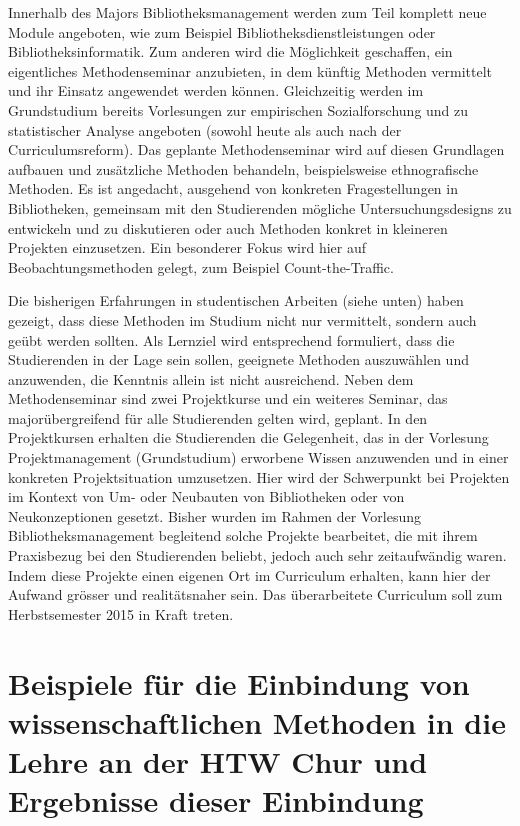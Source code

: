 \documentclass[a4paper,
fontsize=11pt,
oneside,
numbers=noperiodatend,
parskip=half-,
bibliography=totoc,
final
]{scrartcl}
\begin{document}
Innerhalb des Majors Bibliotheksmanagement werden zum Teil komplett neue
Module angeboten, wie zum Beispiel Bibliotheksdienstleistungen oder
Bibliotheksinformatik. Zum anderen wird die Möglichkeit geschaffen, ein
eigentliches Methodenseminar anzubieten, in dem künftig Methoden
vermittelt und ihr Einsatz angewendet werden können. Gleichzeitig werden
im Grundstudium bereits Vorlesungen zur empirischen Sozialforschung und
zu statistischer Analyse angeboten (sowohl heute als auch nach der
Curriculumsreform). Das geplante Methodenseminar wird auf diesen
Grundlagen aufbauen und zusätzliche Methoden behandeln, beispielsweise
ethnografische Methoden. Es ist angedacht, ausgehend von konkreten
Fragestellungen in Bibliotheken, gemeinsam mit den Studierenden mögliche
Untersuchungsdesigns zu entwickeln und zu diskutieren oder auch Methoden
konkret in kleineren Projekten einzusetzen. Ein besonderer Fokus wird
hier auf Beobachtungsmethoden gelegt, zum Beispiel Count-the-Traffic.

Die bisherigen Erfahrungen in studentischen Arbeiten (siehe unten) haben
gezeigt, dass diese Methoden im Studium nicht nur vermittelt, sondern
auch geübt werden sollten. Als Lernziel wird entsprechend formuliert,
dass die Studierenden in der Lage sein sollen, geeignete Methoden
auszuwählen und anzuwenden, die Kenntnis allein ist nicht ausreichend.
Neben dem Methodenseminar sind zwei Projektkurse und ein weiteres
Seminar, das majorübergreifend für alle Studierenden gelten wird,
geplant. In den Projektkursen erhalten die Studierenden die Gelegenheit,
das in der Vorlesung Projektmanagement (Grundstudium) erworbene Wissen
anzuwenden und in einer konkreten Projektsituation umzusetzen. Hier wird
der Schwerpunkt bei Projekten im Kontext von Um- oder Neubauten von
Bibliotheken oder von Neukonzeptionen gesetzt. Bisher wurden im Rahmen
der Vorlesung Bibliotheksmanagement begleitend solche Projekte
bearbeitet, die mit ihrem Praxisbezug bei den Studierenden beliebt,
jedoch auch sehr zeitaufwändig waren. Indem diese Projekte einen eigenen
Ort im Curriculum erhalten, kann hier der Aufwand grösser und
realitätsnaher sein. Das überarbeitete Curriculum soll zum
Herbstsemester 2015 in Kraft treten.

\section*{Beispiele für die Einbindung von wissenschaftlichen
Methoden in die Lehre an der HTW Chur und Ergebnisse dieser
Einbindung}\label{beispiele-fuxfcr-die-einbindung-von-wissenschaftlichen-methoden-in-die-lehre-an-der-htw-chur-und-ergebnisse-dieser-einbindung}
\end{document}
